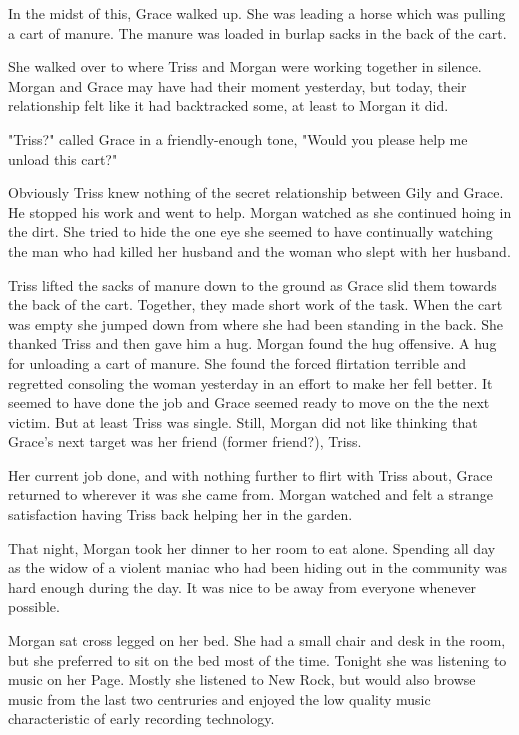 \documentclass[courier]{sffms}
\begin{document}
In the midst of this, Grace walked up. She was leading
a horse which was pulling a cart of manure. The manure
was loaded in burlap sacks in the back of the cart.

She walked over to where Triss and Morgan were working
together in silence. Morgan and Grace may have had their
moment yesterday, but today, their relationship felt like it
had backtracked some, at least to Morgan it did.

"Triss?" called Grace in a friendly-enough tone, "Would you
please help me unload this cart?"

Obviously Triss knew nothing of the secret relationship
between Gily and Grace. He stopped his work and went
to help. Morgan watched as she continued hoing in the
dirt. She tried to hide the one eye she seemed to have
continually watching the man who had killed her husband
and the woman who slept with her husband.

Triss lifted the sacks of manure down to the ground as
Grace slid them towards the back of the cart. Together,
they made short work of the task. When the cart was
empty she jumped down from where she had been standing
in the back. She thanked Triss and then gave him a hug.
Morgan found the hug offensive. A hug for unloading a
cart of manure. She found the forced flirtation terrible
and regretted consoling the woman yesterday in an
effort to make her fell better. It seemed to have done the
job and Grace seemed ready to move on the the next
victim. But at least Triss was single. Still, Morgan did not
like thinking that Grace's next target was her friend
(former friend?), Triss.

Her current job done, and with nothing further to flirt
with Triss about, Grace returned to wherever it was she
came from. Morgan watched and felt a strange
satisfaction having Triss back helping her in the garden.

That night, Morgan took her dinner to her room to eat
alone. Spending all day as the widow of a violent maniac
who had been hiding out in the community was hard
enough during the day. It was nice to be away from
everyone whenever possible.

Morgan sat cross legged on her bed. She had a small
chair and desk in the room, but she preferred to sit on
the bed most of the time. Tonight she was listening to
music on her Page. Mostly she listened to New Rock, but
would also browse music from the last two centruries
and enjoyed the low quality music characteristic of 
early recording technology.
\end{document}
